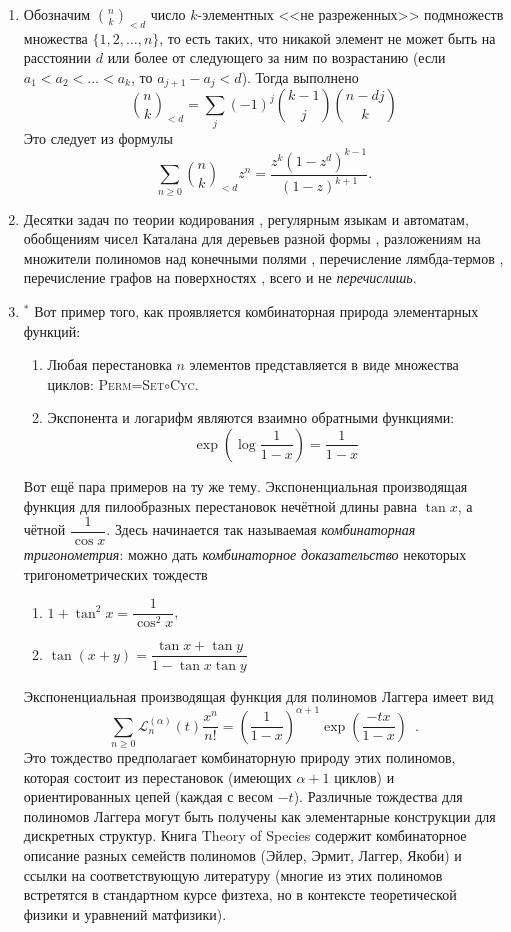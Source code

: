 \documentclass[a5paper]{article}
\theoremstyle{definition}
\begin{document}
\begin{enumerate}
	\item Обозначим \( {n \choose k}_{<d} \) число \( k \)-элементных <<не 
	разреженных>> подмножеств множества \( \{1,2,\ldots, n\} \), то есть таких, 
	что никакой элемент не может быть на расстоянии \( d \) или более от 
	следующего за ним по возрастанию (если \( a_1 < a_2 < \ldots < a_k \), то 
	\( a_{j+1} - a_j < d \)). Тогда выполнено
	\[
		{n \choose k}_{<d} = \sum_j (-1)^j {k-1 \choose j}{n - dj \choose k}
	\]
	Это следует из формулы
	\[
		\sum_{n \geq 0} {n \choose k}_{<d} z^n = \dfrac{z^k 
		(1-z^d)^{k-1}}{(1-z)^{k+1}}.
	\]
	\item Десятки задач по теории кодирования \cite[Section I.4, I.24, p. 
	53]{ac}, регулярным языкам и автоматам, обобщениям чисел Каталана для 
	деревьев разной формы \cite[Section I.5]{ac}, разложениям на множители 
	полиномов над конечными полями \cite[Example VII.4, p. 449]{ac}, 
	перечисление лямбда-термов \cite{lambda}, перечисление графов на 
	поверхностях \cite{graphs_manifolds}, всего и не \textit{перечислишь}.
	\item\( ^{\ast} \) Вот пример того, как проявляется комбинаторная природа 
	элементарных функций:
	\begin{enumerate}
	\item Любая перестановка \( n \) элементов представляется в виде множества 
	циклов: \textsc{Perm}=\textsc{Set}\( \circ \)\textsc{Cyc}.
	\item Экспонента и логарифм являются взаимно обратными функциями:
	\[
		\exp\left(\log \dfrac{1}{1 - x}\right) = \dfrac{1}{1 - x}
	\]
	\end{enumerate}
	Вот ещё пара примеров на ту же тему. Экспоненциальная производящая функция 
	для пилообразных перестановок нечётной длины равна \( \tan x \), а чётной 
	\( \dfrac{1}{\cos x} \). Здесь начинается так называемая 
	\textit{комбинаторная тригонометрия}: можно дать \textit{комбинаторное 
	доказательство} некоторых тригонометрических тождеств \cite[Exercise 5.7, 
	p. 74]{stanley2}
	\begin{enumerate}
		\item \( 1 + \tan^2 x = \dfrac{1}{\cos^2 x} \),
		\item \( \tan(x + y) = \dfrac{\tan x + \tan y}{1 - \tan x \tan y} \)
	\end{enumerate}
	Экспоненциальная производящая функция для полиномов Лаггера имеет вид
	\[
		\sum_{n \geq 0}\mathcal L^{(\alpha)}_{n}(t) \dfrac{x^n}{n!} = 
		\left(\dfrac{1}{1 - x}\right)^{\alpha + 1} \exp\left(
			\dfrac{-tx}{1 - x}
		\right) \enspace .
	\]
	Это тождество предполагает комбинаторную природу этих полиномов, которая 
	состоит из перестановок (имеющих \( \alpha + 1 \) циклов) и ориентированных 
	цепей (каждая с весом \( -t \)). Различные тождества для полиномов Лаггера 
	могут быть получены как элементарные конструкции для дискретных структур. 
	Книга Theory of Species
	\cite{species} содержит комбинаторное описание разных семейств полиномов 
	(Эйлер, Эрмит, Лаггер, Якоби) и 
	ссылки на соответствующую литературу (многие из этих полиномов встретятся в 
	стандартном курсе физтеха, но в контексте теоретической физики и уравнений 
	матфизики).
\end{enumerate}
\end{document}
